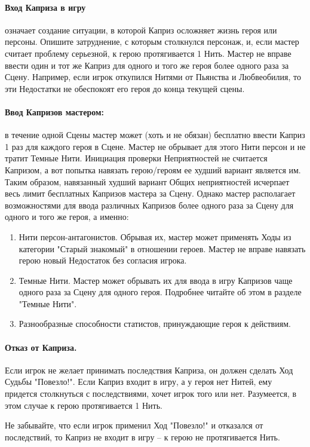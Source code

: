 \paragraph{Вход Каприза в игру} означает создание ситуации, в которой Каприз осложняет жизнь героя или персоны. Опишите затруднение, с которым столкнулся персонаж, и, если мастер считает проблему серьезной, к герою протягивается 1 Нить. 
\newline Мастер не вправе ввести один и тот же Каприз для одного и того же героя более одного раза за Сцену. Например, если игрок откупился Нитями от Пьянства и Любвеобилия, то эти Недостатки не обеспокоят его героя до конца текущей сцены.

\paragraph{Ввод Капризов мастером:} в течение одной Сцены мастер может (хоть и не обязан) бесплатно ввести Каприз 1 раз для каждого героя в Сцене. Мастер не обрывает для этого Нити персон и не тратит Темные Нити.
\newline Инициация проверки Неприятностей не считается Капризом, а вот попытка навязать герою/героям ее худший вариант является им. Таким образом, навязанный худший вариант Общих неприятностей исчерпает весь лимит бесплатных Капризов мастера за Сцену.
\newline Однако мастер располагает возможностями для ввода различных Капризов более одного раза за Сцену для одного и того же героя, а именно: 
\begin{enumerate}
    \item Нити персон-антагонистов. Обрывая их, мастер может применять Ходы из категории "Старый знакомый" в отношении героев. Мастер не вправе навязать герою новый Недостаток без согласия игрока.
    \item Темные Нити. Мастер может обрывать их для ввода в игру Капризов чаще одного раза за Сцену для одного героя. Подробнее читайте об этом в разделе "Темные Нити".
    \item Разнообразные способности статистов, принуждающие героя к действиям.
\end{enumerate}
\paragraph{Отказ от Каприза.} Если игрок не желает принимать последствия Каприза, он должен сделать Ход Судьбы "Повезло!". Если Каприз входит в игру, а у героя нет Нитей, ему придется столкнуться с последствиями, хочет игрок того или нет. Разумеется, в этом случае к герою протягивается 1 Нить. 
\begin{tcolorbox}
	Не забывайте, что если игрок применил Ход "Повезло!" и отказался от последствий, то Каприз не входит в игру – к герою не протягивается Нить. 
\end{tcolorbox}

